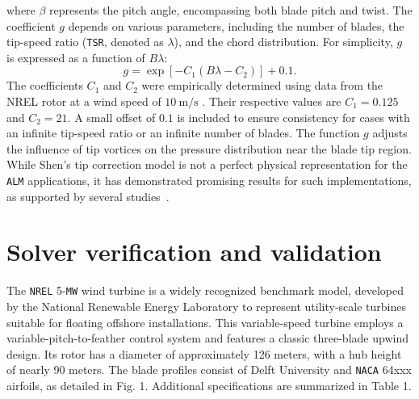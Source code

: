 \documentclass[11pt,a4paper]{article}
\begin{document}
where $\beta$ represents the pitch angle, encompassing both blade pitch and twist. The coefficient $g$ depends on various parameters, including the number of blades, the tip-speed ratio (\texttt{TSR}, denoted as $\lambda$), and the chord distribution. For simplicity, $g$ is expressed as a function of $B\lambda$:
\[
g = \exp \left[-C_1\left(B \lambda - C_2\right)\right] + 0.1.
\]
The coefficients $C_1$ and $C_2$ were empirically determined using data from the NREL rotor at a wind speed of $10~\mathrm{m/s}$ \citep{shen2005tip}. Their respective values are $C_1 = 0.125$ and $C_2 = 21$. A small offset of $0.1$ is included to ensure consistency for cases with an infinite tip-speed ratio or an infinite number of blades. The function $g$ adjusts the influence of tip vortices on the pressure distribution near the blade tip region. While Shen's tip correction model is not a perfect physical representation for the \texttt{ALM} applications, it has demonstrated promising results for such implementations, as supported by several studies~\citep{shen2014study,yu2018study,papi2021development}.


\section{Solver verification and validation}

The \texttt{NREL} 5-\texttt{MW} wind turbine is a widely recognized benchmark model, developed by the National Renewable Energy Laboratory to represent utility-scale turbines suitable for floating offshore installations.
%
This variable-speed turbine employs a variable-pitch-to-feather control system and features a classic three-blade upwind design.
%
Its rotor has a diameter of approximately 126 meters, with a hub height of nearly 90 meters. The blade profiles consist of Delft University and \texttt{NACA} 64xxx airfoils, as detailed in Fig. 1.
%
Additional specifications are summarized in Table 1.




\end{document}
